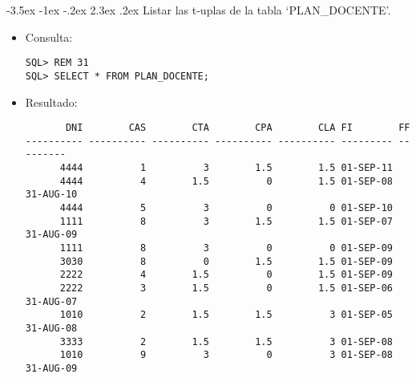 \documentclass[11pt]{report}
\makeatletter
\renewcommand\chapter{\@startsection{chapter}{0}{\z@}%
    {-3.5ex \@plus -1ex \@minus -.2ex}%
    {2.3ex \@plus.2ex}%
    {\normalfont\Large\bfseries}}
\makeatother
\begin{document}
\chapter{Listar las t-uplas de la tabla ‘PLAN\_DOCENTE’.}
\begin{itemize}
  \item Consulta:
  \begin{verbatim}
SQL> REM 31
SQL> SELECT * FROM PLAN_DOCENTE;
  \end{verbatim}
  \item{Resultado:}
  \begin{verbatim}
       DNI        CAS        CTA        CPA        CLA FI        FF                                                                                                                                     
---------- ---------- ---------- ---------- ---------- --------- ---------                                                                                                                              
      4444          1          3        1.5        1.5 01-SEP-11                                                                                                                                        
      4444          4        1.5          0        1.5 01-SEP-08 31-AUG-10                                                                                                                              
      4444          5          3          0          0 01-SEP-10                                                                                                                                        
      1111          8          3        1.5        1.5 01-SEP-07 31-AUG-09                                                                                                                              
      1111          8          3          0          0 01-SEP-09                                                                                                                                        
      3030          8          0        1.5        1.5 01-SEP-09                                                                                                                                        
      2222          4        1.5          0        1.5 01-SEP-09                                                                                                                                        
      2222          3        1.5          0        1.5 01-SEP-06 31-AUG-07                                                                                                                              
      1010          2        1.5        1.5          3 01-SEP-05 31-AUG-08                                                                                                                              
      3333          2        1.5        1.5          3 01-SEP-08                                                                                                                                        
      1010          9          3          0          3 01-SEP-08 31-AUG-09                                                                                                                              


\end{verbatim}
\end{itemize}
\end{document}

